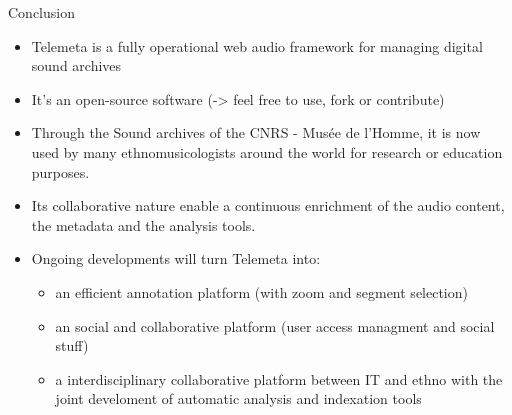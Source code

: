 \documentclass[final, hyperref, table]{beamer}
\begin{document}


\begin{frame}{Conclusion}
  \begin{itemize}[<+->]
  \item Telemeta is a \alert{fully operational} web audio framework for managing digital sound archives
  \item It's an \alert{open-source} software (-> feel free to use, fork or contribute)
  \item Through the Sound archives of the CNRS - Musée de
l’Homme, it is now used by many ethnomusicologists around the world for research or education purposes.
\item Its collaborative nature enable a continuous enrichment of the audio content, the metadata and the analysis tools.
  \item Ongoing developments will turn Telemeta into:
    \begin{itemize}\footnotesize
    \item an efficient annotation platform (with zoom and segment selection)
    \item an social and collaborative platform (user access managment and social stuff)
    \item a interdisciplinary collaborative platform between IT and ethno with the joint develoment of automatic analysis and indexation tools
    \end{itemize}
  \end{itemize}

\end{frame}
\end{document}
